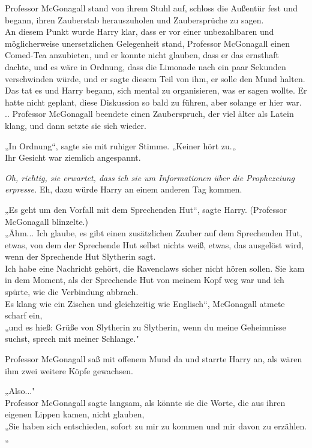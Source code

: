 {Professor McGonagall stand von ihrem Stuhl auf, schloss die Außentür fest und begann, ihren Zauberstab herauszuholen und Zaubersprüche zu sagen.\\ An diesem Punkt wurde Harry klar, dass er vor einer unbezahlbaren und möglicherweise unersetzlichen Gelegenheit stand, Professor McGonagall einen Comed-Tea anzubieten, und er konnte nicht glauben, dass er das ernsthaft dachte, und es wäre in Ordnung, dass die Limonade nach ein paar Sekunden verschwinden würde, und er sagte diesem Teil von ihm, er solle den Mund halten.\\ Das tat es und Harry begann, sich mental zu organisieren, was er sagen wollte. Er hatte nicht geplant, diese Diskussion so bald zu führen, aber solange er hier war.\\ .. Professor McGonagall beendete einen Zauberspruch, der viel älter als Latein klang, und dann setzte sie sich wieder.

„In Ordnung“, sagte sie mit ruhiger Stimme. „Keiner hört zu.„\\ Ihr Gesicht war ziemlich angespannt.

\emph{Oh, richtig, sie erwartet, dass ich sie um Informationen über die Prophezeiung erpresse.} Eh, dazu würde Harry an einem anderen Tag kommen.

„Es geht um den Vorfall mit dem Sprechenden Hut“, sagte Harry. (Professor McGonagall blinzelte.)\\ „Ähm... Ich glaube, es gibt einen zusätzlichen Zauber auf dem Sprechenden Hut, etwas, von dem der Sprechende Hut selbst nichts weiß, etwas, das ausgelöst wird, wenn der Sprechende Hut Slytherin sagt.\\ Ich habe eine Nachricht gehört, die Ravenclaws sicher nicht hören sollen. Sie kam in dem Moment, als der Sprechende Hut von meinem Kopf weg war und ich spürte, wie die Verbindung abbrach.\\ Es klang wie ein Zischen und gleichzeitig wie Englisch“, McGonagall atmete scharf ein,\\ „und es hieß: Grüße von Slytherin zu Slytherin, wenn du meine Geheimnisse suchst, sprech mit meiner Schlange."

Professor McGonagall saß mit offenem Mund da und starrte Harry an, als wären ihm zwei weitere Köpfe gewachsen.

„Also..."\\ Professor McGonagall sagte langsam, als könnte sie die Worte, die aus ihren eigenen Lippen kamen, nicht glauben,\\ „Sie haben sich entschieden, sofort zu mir zu kommen und mir davon zu erzählen.„

}
